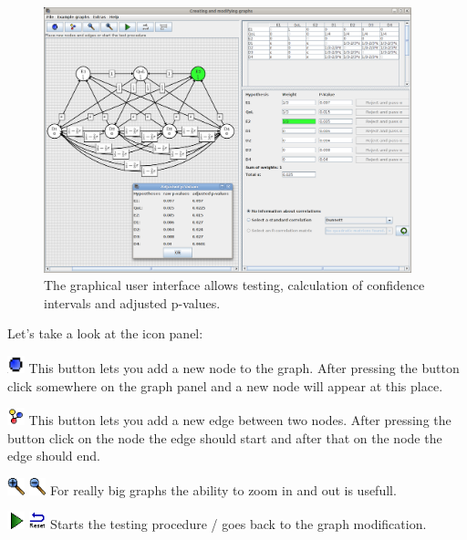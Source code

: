 \documentclass[a4paper, 11pt]{article}
\numberwithin{equation}{section}
\theoremstyle{definition}
\theoremstyle{plain}
\begin{document}
\normalsize

\begin{figure}[ht]
  \centering    
  \includegraphics[width=0.95\textwidth]{pictures/FullFeaturedGUI.png}      
  \caption{\label{fullGUI} The graphical user interface allows testing, calculation of confidence intervals and adjusted p-values.}
\end{figure}

Let's take a look at the icon panel:

\includegraphics[width=0.5cm]{pictures/vertex.png} This button lets
you add a new node to the graph.  After pressing the button click
somewhere on the graph panel and a new node will appear at this place.

\includegraphics[width=0.5cm]{pictures/edge.png} This button lets you
add a new edge between two nodes.  After pressing the button click on
the node the edge should start and after that on the node the edge
should end.

\includegraphics[width=0.5cm]{pictures/zoom_in.png}
\includegraphics[width=0.5cm]{pictures/zoom_out.png} For really big
graphs the ability to zoom in and out is usefull.

\includegraphics[width=0.5cm]{pictures/StartTesting.png}
\includegraphics[width=0.5cm]{pictures/Reset.png} Starts the testing
procedure / goes back to the graph modification.
\end{document}
